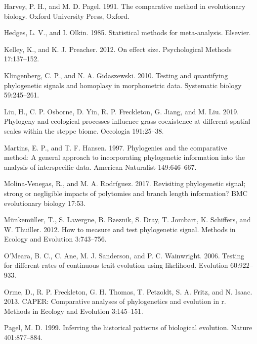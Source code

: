 \documentclass[
]{article}
\begin{document}
\leavevmode\hypertarget{ref-HarveyPagel1991}{}%
Harvey, P. H., and M. D. Pagel. 1991. The comparative method in
evolutionary biology. Oxford University Press, Oxford.

\leavevmode\hypertarget{ref-HedgesOlkin1985}{}%
Hedges, L. V., and I. Olkin. 1985. Statistical methods for
meta-analysis. Elsevier.

\leavevmode\hypertarget{ref-Kelley2012}{}%
Kelley, K., and K. J. Preacher. 2012. On effect size. Psychological
Methods 17:137--152.

\leavevmode\hypertarget{ref-Klingenberg2010}{}%
Klingenberg, C. P., and N. A. Gidaszewski. 2010. Testing and quantifying
phylogenetic signals and homoplasy in morphometric data. Systematic
biology 59:245--261.

\leavevmode\hypertarget{ref-Liu2019}{}%
Liu, H., C. P. Osborne, D. Yin, R. P. Freckleton, G. Jiang, and M. Liu.
2019. Phylogeny and ecological processes influence grass coexistence at
different spatial scales within the steppe biome. Oecologia 191:25--38.

\leavevmode\hypertarget{ref-MartinsHansen1997}{}%
Martins, E. P., and T. F. Hansen. 1997. Phylogenies and the comparative
method: A general approach to incorporating phylogenetic information
into the analysis of interspecific data. American Naturalist
149:646--667.

\leavevmode\hypertarget{ref-MolinaVenegas2017}{}%
Molina-Venegas, R., and M. A. Rodríguez. 2017. Revisiting phylogenetic
signal; strong or negligible impacts of polytomies and branch length
information? BMC evolutionary biology 17:53.

\leavevmode\hypertarget{ref-Munkemuller_et_al2012}{}%
Münkemüller, T., S. Lavergne, B. Bzeznik, S. Dray, T. Jombart, K.
Schiffers, and W. Thuiller. 2012. How to measure and test phylogenetic
signal. Methods in Ecology and Evolution 3:743--756.

\leavevmode\hypertarget{ref-OMeara_et_al2006}{}%
O'Meara, B. C., C. Ane, M. J. Sanderson, and P. C. Wainwright. 2006.
Testing for different rates of continuous trait evolution using
likelihood. Evolution 60:922--933.

\leavevmode\hypertarget{ref-Orme2013}{}%
Orme, D., R. P. Freckleton, G. H. Thomas, T. Petzoldt, S. A. Fritz, and
N. Isaac. 2013. CAPER: Comparative analyses of phylogenetics and
evolution in r. Methods in Ecology and Evolution 3:145--151.

\leavevmode\hypertarget{ref-Pagel1999}{}%
Pagel, M. D. 1999. Inferring the historical patterns of biological
evolution. Nature 401:877--884.
\end{document}
